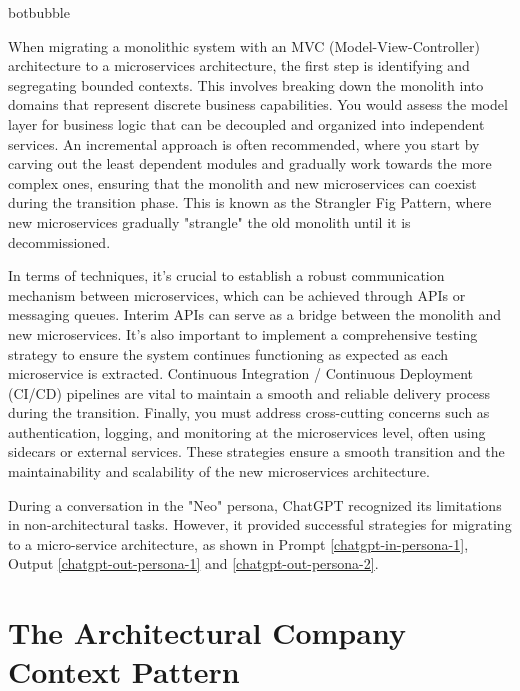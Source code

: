 \begin{chatout}{botbubble}{}

When migrating a monolithic system with an MVC (Model-View-Controller) architecture to a microservices architecture, the first step is identifying and segregating bounded contexts. This involves breaking down the monolith into domains that represent discrete business capabilities. You would assess the model layer for business logic that can be decoupled and organized into independent services. An incremental approach is often recommended, where you start by carving out the least dependent modules and gradually work towards the more complex ones, ensuring that the monolith and new microservices can coexist during the transition phase. This is known as the Strangler Fig Pattern, where new microservices gradually "strangle" the old monolith until it is decommissioned.

In terms of techniques, it's crucial to establish a robust communication mechanism between microservices, which can be achieved through APIs or messaging queues. Interim APIs can serve as a bridge between the monolith and new microservices. It's also important to implement a comprehensive testing strategy to ensure the system continues functioning as expected as each microservice is extracted. Continuous Integration / Continuous Deployment (CI/CD) pipelines are vital to maintain a smooth and reliable delivery process during the transition. Finally, you must address cross-cutting concerns such as authentication, logging, and monitoring at the microservices level, often using sidecars or external services. These strategies ensure a smooth transition and the maintainability and scalability of the new microservices architecture.
\end{chatout}

During a conversation in the "Neo" persona, ChatGPT recognized its limitations in non-architectural tasks. However, it provided successful strategies for migrating to a micro-service architecture, as shown in Prompt \ref{chatgpt-in-persona-1}, Output \ref{chatgpt-out-persona-1} and  \ref{chatgpt-out-persona-2}.

\begin{center}
                       
\end{center}

\section{The Architectural Company Context Pattern} \label{sec:architectural-company-context}

